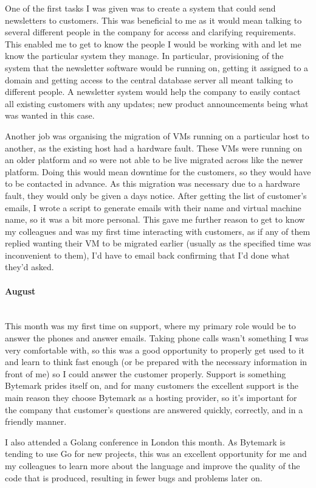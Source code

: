 \documentclass[12pt,a4paper]{article}
\newcommand{\paragraphnl}[1]{\paragraph{#1}\mbox{}\\}
\begin{document}
	One of the first tasks I was given was to create a system that could send
	newsletters to customers. This was beneficial to me as it would mean
	talking to several different people in the company for access and
	clarifying requirements. This enabled me to get to know the people I would
	be working with and let me know the particular system they manage. In
	particular, provisioning of the system that the newsletter software would
	be running on, getting it assigned to a domain and getting access to the
	central database server all meant talking to different people. A newsletter
	system would help the company to easily contact all existing customers with
	any updates; new product announcements being what was wanted in this case.

	Another job was organising the migration of VMs running on a particular
	host to another, as the existing host had a hardware fault. These VMs were
	running on an older platform and so were not able to be live migrated
	across like the newer platform. Doing this would mean downtime for the
	customers, so they would have to be contacted in advance. As this migration
	was necessary due to a hardware fault, they would only be given a days
	notice. After getting the list of customer's emails, I wrote a script to
	generate emails with their name and virtual machine name, so it was a bit
	more personal. This gave me further reason to get to know my colleagues and
	was my first time interacting with customers, as if any of them replied
	wanting their VM to be migrated earlier (usually as the specified time was
	inconvenient to them), I'd have to email back confirming that I'd done what
	they'd asked.

\paragraphnl{August}
	This month was my first time on support, where my primary role would be to
	answer the phones and answer emails. Taking phone calls wasn't something I
	was very comfortable with, so this was a good opportunity to properly get
	used to it and learn to think fast enough (or be prepared with the
	necessary information in front of me) so I could answer the customer
	properly. Support is something Bytemark prides itself on, and for many
	customers the excellent support is the main reason they choose Bytemark as
	a hosting provider, so it's important for the company that customer's
	questions are answered quickly, correctly, and in a friendly manner.

	I also attended a Golang conference in London this month. As Bytemark is
	tending to use Go for new projects, this was an excellent opportunity for
	me and my colleagues to learn more about the language and improve the
	quality of the code that is produced, resulting in fewer bugs and problems
	later on.
\end{document}

